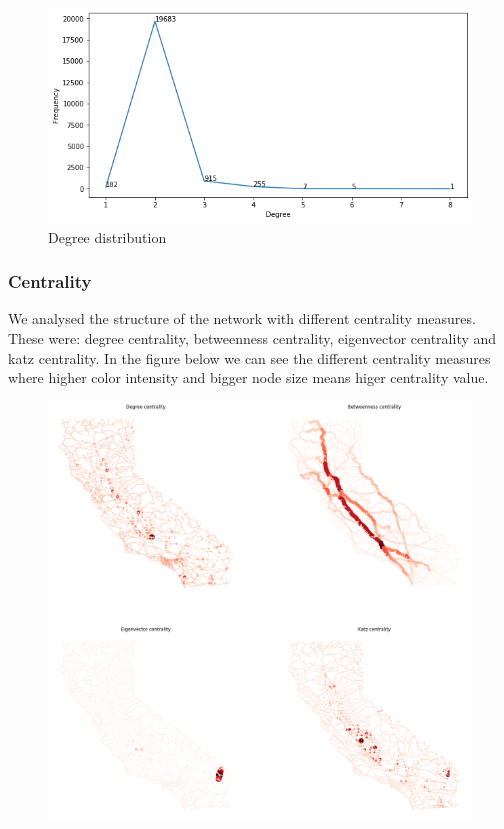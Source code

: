 \documentclass[11pt]{article}
\begin{document}
\begin{figure}[h]
\caption{Degree distribution}
\centering
\includegraphics[scale=0.4]{degree.png}
\end{figure}

\subsubsection{Centrality}
We analysed the structure of the network with different centrality measures. These were: degree centrality, betweenness centrality, eigenvector centrality and katz centrality. In the figure below we can see the different centrality measures where higher color intensity and bigger node size means higer centrality value.  

\begin{figure}[h!]
\centering
\includegraphics[scale=0.24]{centrality.png}
\end{figure}
\end{document}
